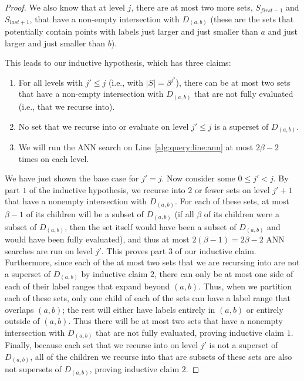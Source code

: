 \documentclass{article}
\theoremstyle{plain}
\theoremstyle{definition}
\theoremstyle{remark}
\newcommand{\julian}[1]{{\color{red}{\bf Julian:} #1}}
\newcommand{\josh}[1]{{\color{orange}{\bf Josh:} #1}}
\begin{document}
\begin{proof}


We also know that at level $j$, there are at most two more sets, $S_{first - 1}$ and $S_{last + 1}$, that have a non-empty intersection with $D_{(a, b)}$ (these are the sets that potentially contain points with labels just larger and just smaller than $a$ and just larger and just smaller than $b$). 

This leads to our inductive hypothesis, which has three claims: 
\begin{enumerate}
    \item For all levels with $j' \le j$ (i.e., with $|S| = \beta^{j'}$), there can be at most two sets that have a non-empty intersection with $D_{(a, b)}$ that are not fully evaluated (i.e., that we recurse into).
    \item No set that we recurse into or evaluate on level $j' \le j$ is a superset of $D_{(a,b)}$. 
    \item We will run the ANN search on Line~\ref{alg:query:line:ann} at most $2\beta - 2$ times on each level.
\end{enumerate}

We have just shown the base case for $j' = j$. Now consider some $0 \le j' < j$. By part $1$ of the inductive hypothesis, we recurse into $2$ or fewer sets  on level $j' + 1$ that have a nonempty intersection with $D_{(a, b)}$. For each of these sets, at most $\beta - 1$ of its children will be a subset of $D_{(a, b)}$ (if all $\beta$ of its children were a subset of $D_{(a, b)}$, then the set itself would have been a subset of $D_{(a, b)}$ and would have been fully evaluated), and thus at most $2(\beta - 1) = 2\beta - 2$ ANN searches are run on level $j'$. This proves part $3$ of our inductive claim. Furthermore, since each of the at most two sets that we are recursing into are not a superset of $D_{(a, b)}$ by inductive claim $2$, there can only be at most one side of each of their label ranges that expand beyond $(a, b)$. Thus, when we partition each of these sets, only one child of each of the sets can have a label range that overlaps $(a, b)$; the rest will either have labels entirely in $(a, b)$ or entirely outside of $(a, b)$. Thus there will be at most two 
sets that have a nonempty intersection with $D_{(a, b)}$ that are not fully evaluated, proving inductive claim $1$. Finally, because each set that we recurse into on level $j'$ is not a superset of $D_{(a, b)}$, all of the children we recurse into that are subsets of these sets are also not supersets of $D_{(a, b)}$, proving inductive claim $2$. 


\end{proof}
\end{document}
